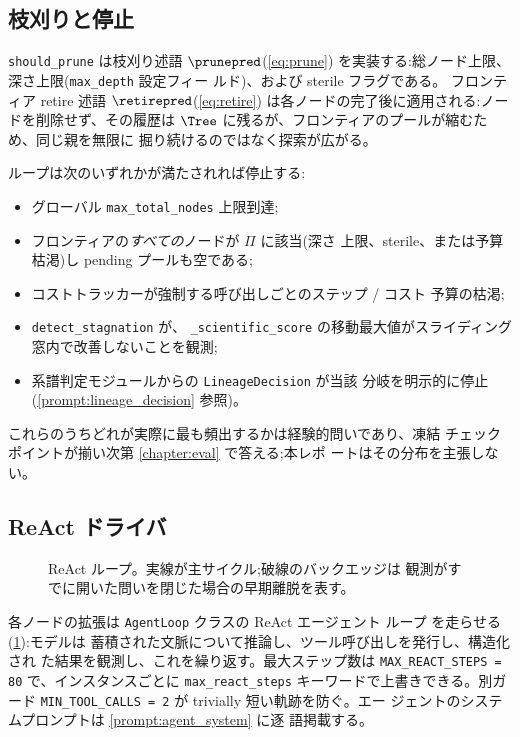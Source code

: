 \subsection{枝刈りと停止}\label{sec:exploration:termination}

\texttt{should\_prune} は枝刈り述語 $\prunepred$(\cref{eq:prune})
を実装する:総ノード上限、深さ上限(\texttt{max\_depth} 設定フィー
ルド)、および sterile フラグである。
フロンティア retire 述語 $\retirepred$(\cref{eq:retire})
は各ノードの完了後に適用される:ノードを削除せず、その履歴は
$\Tree$ に残るが、フロンティアのプールが縮むため、同じ親を無限に
掘り続けるのではなく探索が広がる。

ループは次のいずれかが満たされれば停止する:

\begin{itemize}
  \item グローバル \texttt{max\_total\_nodes} 上限到達;
  \item フロンティアの\emph{すべての}ノードが $\Pi$ に該当(深さ
        上限、sterile、または予算枯渇)し pending プールも空である;
  \item コストトラッカーが強制する呼び出しごとのステップ / コスト
        予算の枯渇;
  \item {} \texttt{detect\_stagnation} が、
        \texttt{\_scientific\_score} の移動最大値がスライディング
        窓内で改善しないことを観測;
  \item 系譜判定モジュールからの \texttt{LineageDecision} が当該
        分岐を明示的に停止(\cref{prompt:lineage_decision} 参照)。
\end{itemize}

これらのうちどれが実際に最も頻出するかは経験的問いであり、凍結
チェックポイントが揃い次第 \cref{chapter:eval} で答える;本レポ
ートはその分布を主張しない。

\subsection{ReAct ドライバ}\label{sec:exploration:react}

\begin{figure}[t]
  \centering
  \resizebox{\columnwidth}{!}{}
  \caption{ReAct ループ。実線が主サイクル;破線のバックエッジは
           観測がすでに開いた問いを閉じた場合の早期離脱を表す。}
  \label{fig:react}
\end{figure}

各ノードの拡張は \texttt{AgentLoop} クラスの ReAct エージェント
ループ \cite{yao2023react} を走らせる(\cref{fig:react}):モデルは
蓄積された文脈について推論し、ツール呼び出しを発行し、構造化され
た結果を観測し、これを繰り返す。最大ステップ数は
\texttt{MAX\_REACT\_STEPS = 80} で、インスタンスごとに
\texttt{max\_react\_steps} キーワードで上書きできる。別ガード
\texttt{MIN\_TOOL\_CALLS = 2} が trivially 短い軌跡を防ぐ。エー
ジェントのシステムプロンプトは \cref{prompt:agent_system} に逐
語掲載する。

